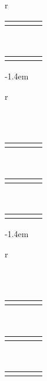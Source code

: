 \begin{center}
\begin{tabular}{r}
\begin{tabular}{C{0.1cm}C{0.1cm}|C{0.1cm}|C{0.1cm}|}
       &  & \cbeige &\cbeige \\
    \end{tabular}\\[0.1ex]
    \begin{tabular}{C{0.1cm}C{0.1cm}C{0.1cm}|C{0.1cm}|}
       &  &  &\cbeige \\
    \end{tabular}
    \end{tabular}
  \kern-1.4em
  \begin{tabular}{r}
    \begin{tabular}{C{0.1cm}|C{0.1cm}|C{0.1cm}|C{0.1cm}|}
      \hline
       \csteelblue& \csteelblue &\csteelblue  &\csteelblue \\
      \hline
    \end{tabular}\\[0.1ex]
    \begin{tabular}{C{0.1cm}|C{0.1cm}|C{0.1cm}|C{0.1cm}|}
       & \csteelblue & \csteelblue & \csteelblue\\
    \end{tabular}\\[0.1ex]
    \begin{tabular}{C{0.1cm}C{0.1cm}|C{0.1cm}|C{0.1cm}|}
       &  & \csteelblue & \csteelblue\\
    \end{tabular}\\[0.1ex]
    \begin{tabular}{C{0.1cm}C{0.1cm}C{0.1cm}|C{0.1cm}|}
       &  &  & \csteelblue\\
    \end{tabular}
    \end{tabular}
  \kern-1.4em
  \begin{tabular}{r}
    \begin{tabular}{C{0.1cm}|C{0.1cm}|C{0.1cm}|C{0.1cm}|}
      \hline
       \cpurple& \cpurple &\cpurple  &\cpurple \\
      \hline
    \end{tabular}\\[0.1ex]
    \begin{tabular}{C{0.1cm}|C{0.1cm}|C{0.1cm}|C{0.1cm}|}
       & \cpurple & \cpurple & \cpurple\\
    \end{tabular}\\[0.1ex]
    \begin{tabular}{C{0.1cm}C{0.1cm}|C{0.1cm}|C{0.1cm}|}
       &  & \cpurple & \cpurple\\
    \end{tabular}\\[0.1ex]
    \begin{tabular}{C{0.1cm}C{0.1cm}C{0.1cm}|C{0.1cm}|}
       &  &  &\cpurple \\
    \end{tabular}
    \end{tabular}
  \end{center}\bigskip


